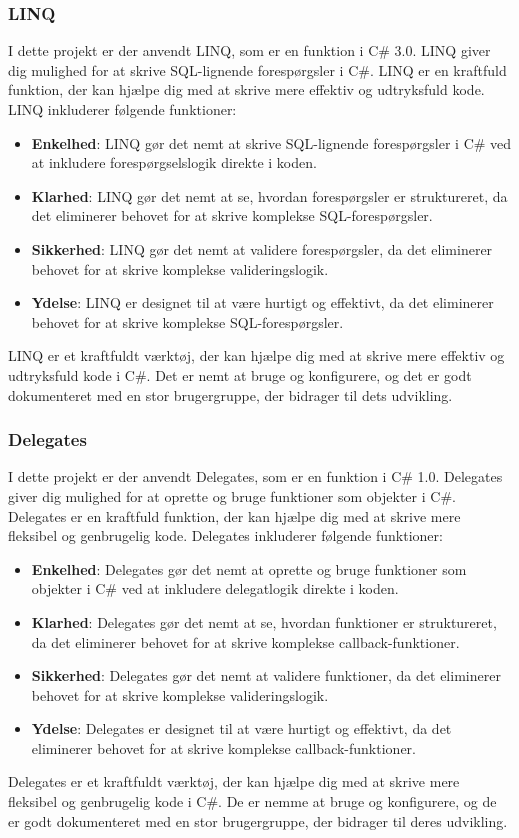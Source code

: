 \subsubsection{LINQ}
I dette projekt er der anvendt LINQ, som er en funktion i C\# 3.0. LINQ giver dig mulighed for at skrive SQL-lignende forespørgsler i C\#. LINQ er en kraftfuld funktion, der kan hjælpe dig med at skrive mere effektiv og udtryksfuld kode.
LINQ inkluderer følgende funktioner:
\begin{itemize}
    \item \textbf{Enkelhed}: LINQ gør det nemt at skrive SQL-lignende forespørgsler i C\# ved at inkludere forespørgselslogik direkte i koden.
    \item \textbf{Klarhed}: LINQ gør det nemt at se, hvordan forespørgsler er struktureret, da det eliminerer behovet for at skrive komplekse SQL-forespørgsler.
    \item \textbf{Sikkerhed}: LINQ gør det nemt at validere forespørgsler, da det eliminerer behovet for at skrive komplekse valideringslogik.
    \item \textbf{Ydelse}: LINQ er designet til at være hurtigt og effektivt, da det eliminerer behovet for at skrive komplekse SQL-forespørgsler.
\end{itemize}
LINQ er et kraftfuldt værktøj, der kan hjælpe dig med at skrive mere effektiv og udtryksfuld kode i C\#. Det er nemt at bruge og konfigurere, og det er godt dokumenteret med en stor brugergruppe, der bidrager til dets udvikling.

\subsubsection{Delegates}
I dette projekt er der anvendt Delegates, som er en funktion i C\# 1.0. Delegates giver dig mulighed for at oprette og bruge funktioner som objekter i C\#. Delegates er en kraftfuld funktion, der kan hjælpe dig med at skrive mere fleksibel og genbrugelig kode.
Delegates inkluderer følgende funktioner:
\begin{itemize}
    \item \textbf{Enkelhed}: Delegates gør det nemt at oprette og bruge funktioner som objekter i C\# ved at inkludere delegatlogik direkte i koden.
    \item \textbf{Klarhed}: Delegates gør det nemt at se, hvordan funktioner er struktureret, da det eliminerer behovet for at skrive komplekse callback-funktioner.
    \item \textbf{Sikkerhed}: Delegates gør det nemt at validere funktioner, da det eliminerer behovet for at skrive komplekse valideringslogik.
    \item \textbf{Ydelse}: Delegates er designet til at være hurtigt og effektivt, da det eliminerer behovet for at skrive komplekse callback-funktioner.
\end{itemize}
Delegates er et kraftfuldt værktøj, der kan hjælpe dig med at skrive mere fleksibel og genbrugelig kode i C\#. De er nemme at bruge og konfigurere, og de er godt dokumenteret med en stor brugergruppe, der bidrager til deres udvikling.

